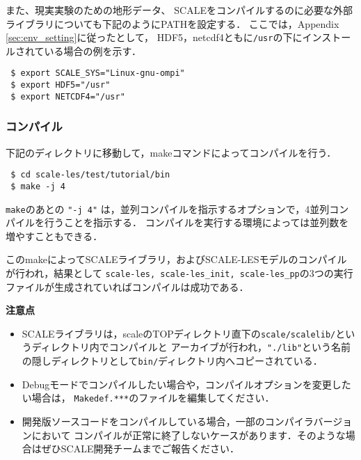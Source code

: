 また、現実実験のための地形データ、
SCALEをコンパイルするのに必要な外部ライブラリについても下記のようにPATHを設定する．
ここでは，Appendix \ref{sec:env_setting}に従ったとして，
HDF5，netcdf4ともに\verb|/usr|の下にインストールされている場合の例を示す．

\begin{verbatim}
 $ export SCALE_SYS="Linux-gnu-ompi"
 $ export HDF5="/usr"
 $ export NETCDF4="/usr"
\end{verbatim}


\subsubsection{コンパイル}

下記のディレクトリに移動して，makeコマンドによってコンパイルを行う．
\begin{verbatim}
 $ cd scale-les/test/tutorial/bin
 $ make -j 4
\end{verbatim}

\verb|make|のあとの \verb|"-j 4"| は，並列コンパイルを指示するオプションで，4並列コンパイルを行うことを指示する．
コンパイルを実行する環境によっては並列数を増やすこともできる．

このmakeによってSCALEライブラリ，およびSCALE-LESモデルのコンパイルが行われ，結果として
\verb|scale-les, scale-les_init, scale-les_pp|の3つの実行ファイルが生成されていればコンパイルは成功である．


{\bf 注意点}
\begin{itemize}
\item SCALEライブラリは，scaleのTOPディレクトリ直下の\verb|scale/scalelib/|というディレクトリ内でコンパイルと
アーカイブが行われ，\verb|"./lib"|という名前の隠しディレクトリとして\verb|bin/|ディレクトリ内へコピーされている．\\
\item Debugモードでコンパイルしたい場合や，コンパイルオプションを変更したい場合は，
      \verb|Makedef.***|のファイルを編集してください．
\item 開発版ソースコードをコンパイルしている場合，一部のコンパイラバージョンにおいて
      コンパイルが正常に終了しないケースがあります．そのような場合はぜひSCALE開発チームまでご報告ください．
\end{itemize}





